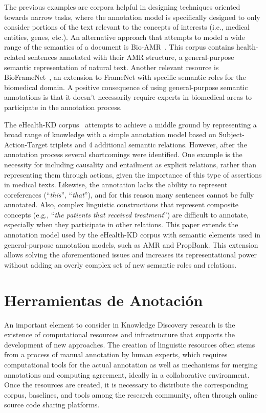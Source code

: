   The previous examples are corpora helpful in designing techniques oriented towards narrow tasks,
  where the annotation model is specifically designed to only consider portions of the text relevant to the concepts of interests (i.e., medical entities, genes, etc.).
  An alternative approach that attempts to model a wide range of the semantics of a document is {Bio-AMR}~\cite{bioamr}.
  This corpus contains health-related sentences annotated with their AMR structure, a general-purpose semantic representation of natural text.
  Another relevant resource is BioFrameNet~\cite{bioframenet}, an extension to FrameNet with specific semantic roles for the biomedical domain.
  A positive consequence of using general-purpose semantic annotations is that it doesn't necessarily require experts in biomedical areas to participate in the annotation process.

  The {eHealth-KD} corpus~\cite{martinez2018overview} attempts to achieve a middle ground by representing a broad range of knowledge with a simple annotation model based on Subject-Action-Target triplets and 4 additional semantic relations.
  However, after the annotation process several shortcomings were identified.
  One example is the necessity for including {causality} and {entailment} as explicit relations, rather than representing them through actions, given the importance of this type of assertions in medical texts.
  Likewise, the annotation lacks the ability to represent coreferences (``\textit{this}'', ``\textit{that}''), and for this reason many sentences cannot be fully annotated.
  Also, complex linguistic constructions that represent composite concepts (e.g., ``\textit{the patients that received treatment}'') are difficult to annotate, especially when they participate in other relations.
  This paper extends the annotation model used by the eHealth-KD corpus with semantic elements used in general-purpose annotation models, such as AMR and PropBank.
  This extension allows solving the aforementioned issues and increases its representational power without adding an overly complex set of new semantic roles and relations.

  \section{Herramientas de Anotación}

  An important element to consider in Knowledge Discovery research is the existence of computational
  resources and infrastructure that supports the development of new approaches.
  The creation of linguistic resources often stems from a process of manual annotation by human
  experts, which requires computational tools for the actual annotation as well as mechanisms for merging
  annotations and computing agreement, ideally in a collaborative environment.
  Once the resources are created, it is necessary to distribute the corresponding corpus, baselines, and tools among the research community, often through online source code sharing platforms.

